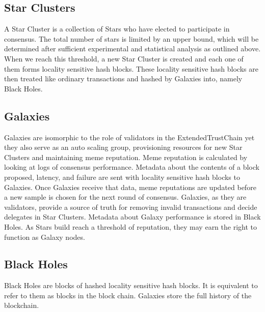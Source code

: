 \documentclass{article}
\begin{document}
\subsection{Star Clusters}
A Star Cluster is a collection of Stars who have elected to participate in consensus. The total number of stars is limited by an upper bound, which will be determined after sufficient experimental and statistical analysis as outlined above. When we reach this threshold, a new Star Cluster is created and each one of them forms locality sensitive hash blocks. These locality sensitive hash blocks are then treated like ordinary transactions and hashed by Galaxies into, namely Black Holes.

\subsection{Galaxies}
Galaxies are isomorphic to the role of validators in the ExtendedTrustChain yet they also serve as an auto scaling group, provisioning resources for new Star Clusters and maintaining meme reputation. Meme reputation is calculated by looking at logs of consensus performance. Metadata about the contents of a block proposed, latency, and failure are sent with locality sensitive hash blocks to Galaxies. Once Galaxies receive that data, meme reputations are updated before a new sample is chosen for the next round of consensus. Galaxies, as they are validators, provide a source of truth for removing invalid transactions and decide delegates in Star Clusters. Metadata about Galaxy performance is stored in Black Holes. As Stars build reach a threshold of reputation, they may earn the right to function as Galaxy nodes.

\subsection{Black Holes}
Black Holes are blocks of hashed locality sensitive hash blocks. It is equivalent to refer to them as blocks in the block chain. Galaxies store the full history of the blockchain.
\end{document}

